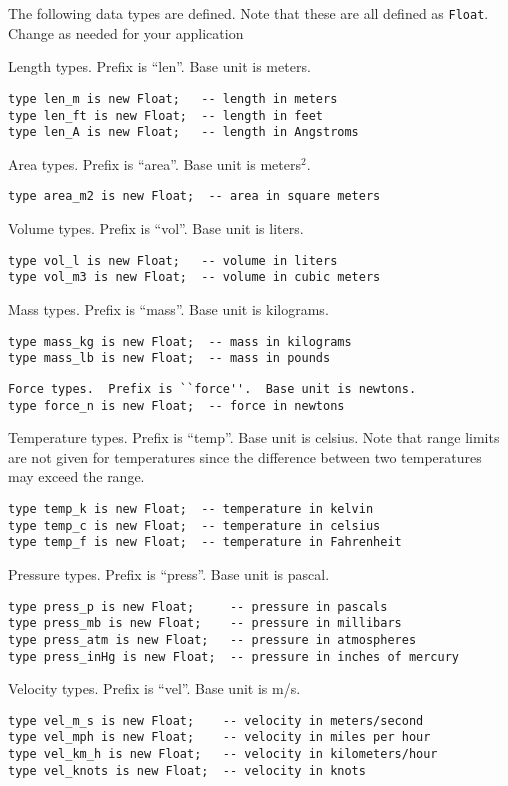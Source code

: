 \documentclass[10pt, openany]{book}
\newcommand{\datatype}[1]{\texttt{#1}}
\begin{document}
The following data types are defined.  Note that these are all defined as \datatype{Float}.  Change as needed for your application

Length types.  Prefix is ``len''.  Base unit is meters.
\begin{lstlisting}
type len_m is new Float;   -- length in meters
type len_ft is new Float;  -- length in feet
type len_A is new Float;   -- length in Angstroms
\end{lstlisting}
Area types.  Prefix is ``area''.  Base unit is meters$^2$.
\begin{lstlisting}
type area_m2 is new Float;  -- area in square meters
\end{lstlisting}
Volume types.  Prefix is ``vol''.  Base unit is liters.
\begin{lstlisting}
type vol_l is new Float;   -- volume in liters
type vol_m3 is new Float;  -- volume in cubic meters
\end{lstlisting}
Mass types.  Prefix is ``mass''.  Base unit is kilograms.
\begin{lstlisting}
type mass_kg is new Float;  -- mass in kilograms
type mass_lb is new Float;  -- mass in pounds
\end{lstlisting}
\begin{lstlisting}
Force types.  Prefix is ``force''.  Base unit is newtons.
type force_n is new Float;  -- force in newtons
\end{lstlisting}
Temperature types.  Prefix is ``temp''.  Base unit is celsius.  Note that range limits are not given for temperatures since the difference between two temperatures may exceed the range.
\begin{lstlisting}
type temp_k is new Float;  -- temperature in kelvin
type temp_c is new Float;  -- temperature in celsius
type temp_f is new Float;  -- temperature in Fahrenheit
\end{lstlisting}
Pressure types.  Prefix is ``press''.  Base unit is pascal.
\begin{lstlisting}
type press_p is new Float;     -- pressure in pascals
type press_mb is new Float;    -- pressure in millibars
type press_atm is new Float;   -- pressure in atmospheres
type press_inHg is new Float;  -- pressure in inches of mercury
\end{lstlisting}
Velocity types.  Prefix is ``vel''.  Base unit is m/s.
\begin{lstlisting}
type vel_m_s is new Float;    -- velocity in meters/second
type vel_mph is new Float;    -- velocity in miles per hour
type vel_km_h is new Float;   -- velocity in kilometers/hour
type vel_knots is new Float;  -- velocity in knots
\end{lstlisting}
\end{document}

